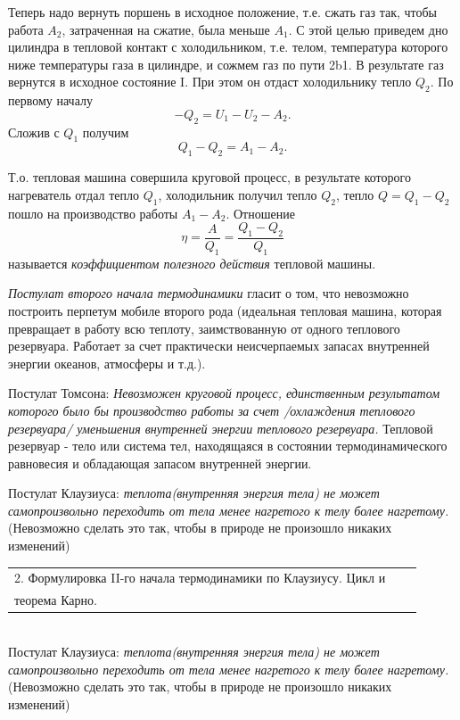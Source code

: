 \documentclass[14pt,a4paper]{scrartcl}
\begin{document}
		\quad Теперь надо вернуть поршень в исходное положение, т.е. сжать газ так, чтобы работа $A_2$, затраченная на сжатие, была меньше $A_1$. С этой целью приведем дно цилиндра в тепловой контакт с холодильником, т.е. телом, температура которого ниже температуры газа в цилиндре, и сожмем газ по пути 2b1. В результате газ вернутся в исходное состояние I. При этом он отдаст холодильнику тепло $Q_2$. По первому началу $$-Q_2 = U_1 - U_2 - A_2.$$ Сложив с $Q_1$ получим $$Q_1 - Q_2 = A_1 - A_2.$$
		
		\quad Т.о. тепловая машина совершила круговой процесс, в результате которого нагреватель отдал тепло $Q_1$, холодильник получил тепло $Q_2$, тепло $Q = Q_1 - Q_2$ пошло на производство работы $A_1 - A_2$. Отношение $$\eta = \dfrac{A}{Q_1} = \dfrac{Q_1-Q_2}{Q_1}$$ называется \textit{коэффициентом полезного действия} тепловой машины.
		
		\quad\textit{Постулат второго начала термодинамики} гласит о том, что невозможно построить перпетум мобиле второго рода (идеальная тепловая машина, которая превращает в работу всю теплоту, заимствованную от одного теплового резервуара. Работает за счет практически неисчерпаемых запасах внутренней энергии океанов, атмосферы и т.д.). 
		
		\quad Постулат Томсона: \textit{Невозможен круговой процесс, единственным результатом которого было бы производство работы за счет /охлаждения теплового резервуара/ уменьшения внутренней энергии теплового резервуара.} Тепловой резервуар - тело или система тел, находящаяся в состоянии термодинамического равновесия и обладающая запасом внутренней энергии.
		
		\quad Постулат Клаузиуса: \textit{теплота(внутренняя энергия тела) не может самопроизвольно переходить от тела менее нагретого к телу более нагретому.} (Невозможно сделать это так, чтобы в природе не произошло никаких изменений)\\
		
		\begin{tabular}[t]{|l|ll|} 
			\hline
			 2. Формулировка II-го начала термодинамики по Клаузиусу. Цикл и \\теорема
			 Карно.\\
			 \hline
		 \end{tabular}\\
		
		\quad Постулат Клаузиуса: \textit{теплота(внутренняя энергия тела) не может самопроизвольно переходить от тела менее нагретого к телу более нагретому.} (Невозможно сделать это так, чтобы в природе не произошло никаких изменений)\\
		
\end{document}

